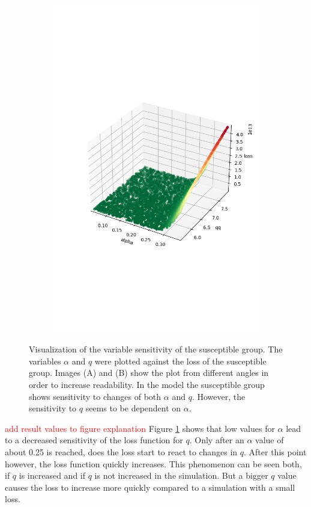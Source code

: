 \begin{figure}
\begin{subfigure}[b]{0.4\textwidth}
		\includegraphics[width=\textwidth]{./figures/sensitivity/sensitivity_zoom0_0.png}	
	\end{subfigure}
	\caption{Visualization of the variable sensitivity of the susceptible group. The variables $\alpha$ and $q$ were plotted
		against the loss of the susceptible group. Images (A) and (B) show the plot from different angles in order
		to increase readability. In the model the susceptible group shows sensitivity to changes of both $\alpha$ and
		$q$. However, the sensitivity to $q$ seems to be dependent on $\alpha$.
		}
	\label{fig:sensitivity_zoom0}
\end{figure}

\textcolor{red}{add result values to figure explanation}
Figure \ref*{fig:sensitivity_zoom0} shows that low values for $\alpha$ lead to a decreased sensitivity of the loss function
for $q$. Only after an $\alpha$ value of about 0.25 is reached, does the loss start to react to changes in $q$. After this point
however, the loss function quickly increases. This phenomenon can be seen both, if $q$ is increased and if $q$ is not increased
in the simulation. But a bigger $q$ value causes the loss to increase more quickly compared to a simulation with a small loss.



